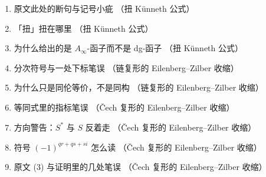 \documentclass[11pt,a4paper]{article}
\theoremstyle{cnth}
\begin{document}
\begin{enumerate}[label={译注 \arabic*：},leftmargin=2.8cm,itemsep=1pt]
\item 原文此处的断句与记号小疵 \quad（扭 Künneth 公式）
\item 「扭」扭在哪里 \quad（扭 Künneth 公式）
\item 为什么给出的是 $A_{\infty}$-函子而不是 dg-函子 \quad（扭 Künneth 公式）
\item 分次符号与一处下标笔误 \quad（链复形的 Eilenberg--Zilber 收缩）
\item 为什么只是同伦等价，不是同构 \quad（链复形的 Eilenberg--Zilber 收缩）
\item 等同式里的指标笔误 \quad（\v{C}ech 复形的 Eilenberg--Zilber 收缩）
\item 方向警告：$S^*$ 与 $S$ 反着走 \quad（\v{C}ech 复形的 Eilenberg--Zilber 收缩）
\item 符号 $(-1)^{qr+qs+si}$ 怎么读 \quad（\v{C}ech 复形的 Eilenberg--Zilber 收缩）
\item 原文 (3) 与证明里的几处笔误 \quad（\v{C}ech 复形的 Eilenberg--Zilber 收缩）
\end{enumerate}
\end{document}
